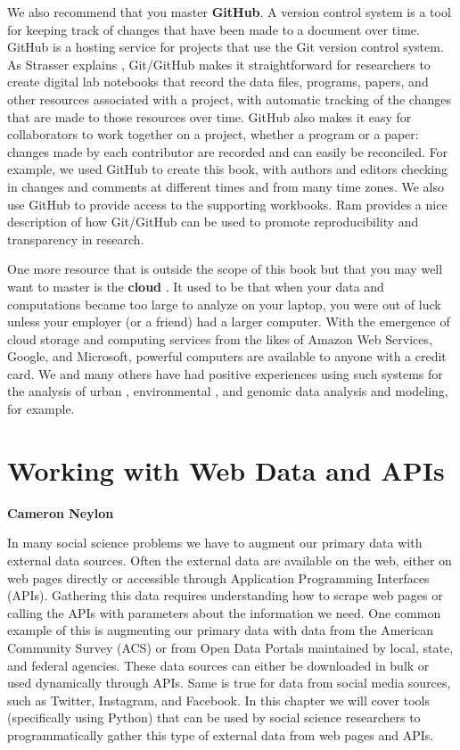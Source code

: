 \documentclass[]{krantz}
\begin{document}
We also recommend that you master \textbf{GitHub}. A version control
system is a tool for keeping track of changes that have been made to a
document over time. GitHub is a hosting service for projects that use
the Git version control system. As Strasser explains
\citep{GitResearch}, Git/GitHub makes it straightforward for researchers
to create digital lab notebooks that record the data files, programs,
papers, and other resources associated with a project, with automatic
tracking of the changes that are made to those resources over time.
GitHub also makes it easy for collaborators to work together on a
project, whether a program or a paper: changes made by each contributor
are recorded and can easily be reconciled. For example, we used GitHub
to create this book, with authors and editors checking in changes and
comments at different times and from many time zones. We also use GitHub
to provide access to the supporting workbooks. Ram \citep{ram2013git}
provides a nice description of how Git/GitHub can be used to promote
reproducibility and transparency in research.

One more resource that is outside the scope of this book but that you
may well want to master is the \textbf{cloud}
\citep{armbrust2010view, Lifka}. It used to be that when your data and
computations became too large to analyze on your laptop, you were out of
luck unless your employer (or a friend) had a larger computer. With the
emergence of cloud storage and computing services from the likes of
Amazon Web Services, Google, and Microsoft, powerful computers are
available to anyone with a credit card. We and many others have had
positive experiences using such systems for the analysis of urban
\citep{plenario}, environmental \citep{elliott2014parallel}, and genomic
\citep{bhuvaneshwar2015case} data analysis and modeling, for example.

\hypertarget{chap:web}{\chapter{Working with Web Data and
APIs}\label{chap:web}}

\textbf{Cameron Neylon}

In many social science problems we have to augment our primary data with
external data sources. Often the external data are available on the web,
either on web pages directly or accessible through Application
Programming Interfaces (APIs). Gathering this data requires
understanding how to scrape web pages or calling the APIs with
parameters about the information we need. One common example of this is
augmenting our primary data with data from the American Community Survey
(ACS) or from Open Data Portals maintained by local, state, and federal
agencies. These data sources can either be downloaded in bulk or used
dynamically through APIs. Same is true for data from social media
sources, such as Twitter, Instagram, and Facebook. In this chapter we
will cover tools (specifically using Python) that can be used by social
science researchers to programmatically gather this type of external
data from web pages and APIs.
\end{document}

